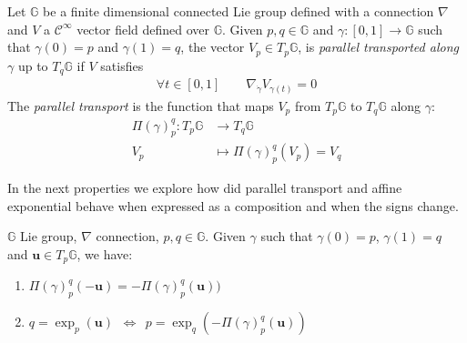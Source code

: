 \begin{definition}
	Let $\mathbb{G}$ be a finite dimensional connected Lie group defined with a connection $\nabla$ and $V$ a $\mathcal{C}^{\infty}$ vector field defined over $\mathbb{G}$. Given $p,q \in \mathbb{G}$ and $\gamma : [0,1] \rightarrow \mathbb{G}$ such that $\gamma(0) = p$ and $\gamma(1) = q$, the vector $V_{p} \in T_{p}\mathbb{G}$, is \emph{parallel transported along $\gamma$} up to $T_{q}\mathbb{G}$ if $V$ satisfies
	\begin{align*}
	\forall t \in  [0,1]
	\qquad
	\nabla_{\dot{\gamma}}V_{\gamma(t)} = 0
	\end{align*}
	The \emph{parallel transport} is the function that maps $V_{p}$ from $T_{p}\mathbb{G}$ to $T_{q}\mathbb{G}$ along $\gamma$:
	\begin{align*}
	\Pi(\gamma)_{p}^{q} :  T_{p}\mathbb{G} & \longrightarrow T_{q}\mathbb{G}  \\
	V_{p}&\longmapsto \Pi(\gamma)_{p}^{q}(V_{p}) = V_{q}
	\end{align*}
\end{definition}
\noindent
In the next properties we explore how did parallel transport and affine exponential behave when expressed as a composition and when the signs change.
\begin{prop}[Inversion]
	$\mathbb{G}$ Lie group, $\nabla$ connection, $p,q\in\mathbb{G}$. Given $\gamma$ such that $\gamma(0)= p$, $\gamma(1)=q$ and $\mathbf{u}\in T_{p}\mathbb{G}$, we have:
	\begin{enumerate}
	\item $\Pi(\gamma)_{p}^{q}(-\mathbf{u}) = -\Pi(\gamma)_{p}^{q}(\mathbf{u}) )$
	\item $q = \exp_{p}(\mathbf{u}) \phantom{z} \Longleftrightarrow \phantom{z} p = \exp_{q}(-\Pi(\gamma)_{p}^{q}(\mathbf{u}))$
	\end{enumerate}
\end{prop}

